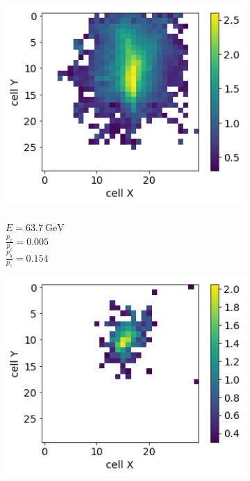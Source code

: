 \documentclass{webofc}
\begin{document}
\begin{figure}
\captionsetup[subfigure]{justification=centering}
  \centering
  \begin{subfigure}{0.24\textwidth}
    \centering
    \includegraphics[width=1\textwidth]{figures/1_real.png}
    \caption{\\$E = 63.7~\text{GeV}$ \\ $\frac{p_x}{p_z}=0.005$ \\ $\frac{p_y}{p_z}=0.154$}\label{fig:real-imgs-1}
  \end{subfigure}
  \begin{subfigure}{0.24\textwidth}
    \centering
    \includegraphics[width=1\textwidth]{figures/2_real.png}

\end{subfigure}
\end{figure}
\end{document}
